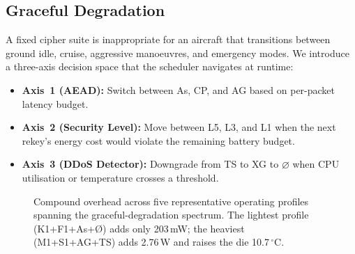 \documentclass[conference]{IEEEtran}
\begin{document}
\subsection{Graceful Degradation}
\label{sec:degrade}

A fixed cipher suite is inappropriate for an aircraft that
transitions between ground idle, cruise, aggressive manoeuvres, and
emergency modes.  We introduce a three-axis decision space that the
scheduler navigates at runtime:

\begin{itemize}
  \item \textbf{Axis~1 (AEAD):} Switch between As, CP, and AG
    based on per-packet latency budget.
  \item \textbf{Axis~2 (Security Level):} Move between L5, L3, and L1
    when the next rekey's energy cost would violate the remaining
    battery budget.
  \item \textbf{Axis~3 (DDoS Detector):} Downgrade from TS to XG to
    $\varnothing$ when CPU utilisation or temperature crosses a threshold.
\end{itemize}

\begin{figure}[t]
\centering
{}
\caption{Compound overhead across five representative operating
  profiles spanning the graceful-degradation spectrum.  The lightest
  profile (K1+F1+As+\O) adds only 203\,mW; the heaviest
  (M1+S1+AG+TS) adds 2.76\,W and raises the die 10.7\,$^\circ$C.}
\label{fig:degrade}
\end{figure}
\end{document}
